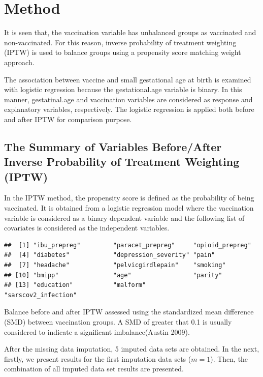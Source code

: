 \documentclass[
]{article}
\begin{document}
\hypertarget{method}{%
\section{Method}\label{method}}

It is seen that, the vaccination variable has unbalanced groups as
vaccinated and non-vaccinated. For this reason, inverse probability of
treatment weighting (IPTW) is used to balance groups using a propensity
score matching weight approach.

The association between vaccine and small gestational age at birth is
examined with logistic regression because the gestational.age variable
is binary. In this manner, gestatinal.age and vaccination variables are
considered as response and explanatory variables, respectively. The
logistic regression is applied both before and after IPTW for comparison
purpose.

\hypertarget{the-summary-of-variables-beforeafter-inverse-probability-of-treatment-weighting-iptw}{%
\subsection{The Summary of Variables Before/After Inverse Probability of
Treatment Weighting
(IPTW)}\label{the-summary-of-variables-beforeafter-inverse-probability-of-treatment-weighting-iptw}}

In the IPTW method, the propensity score is defined as the probability
of being vaccinated. It is obtained from a logistic regression model
where the vaccination variable is considered as a binary dependent
variable and the following list of covariates is considered as the
independent variables.

\begin{verbatim}
##  [1] "ibu_prepreg"         "paracet_prepreg"     "opioid_prepreg"     
##  [4] "diabetes"            "depression_severity" "pain"               
##  [7] "headache"            "pelvicgirdlepain"    "smoking"            
## [10] "bmipp"               "age"                 "parity"             
## [13] "education"           "malform"             "sarscov2_infection"
\end{verbatim}

Balance before and after IPTW assessed using the standardized mean
difference (SMD) between vaccination groups. A SMD of greater that 0.1
is usually considered to indicate a significant imbalance(Austin 2009).

After the missing data imputation, 5 imputed data sets are obtained. In
the next, firstly, we present results for the first imputation data sets
(\(m = 1\)). Then, the combination of all imputed data set results are
presented.
\end{document}
